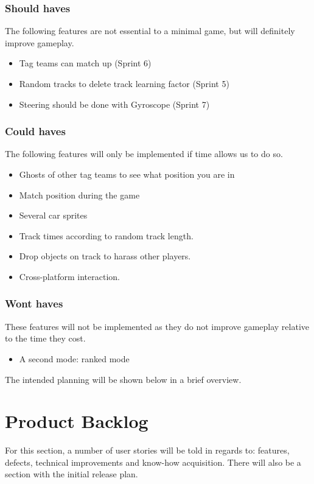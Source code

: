 \documentclass{article}
\begin{document}
\subsubsection{Should haves}
The following features are not essential to a minimal game, but will definitely improve gameplay.
\begin{itemize}
    \item Tag teams can match up (Sprint 6)  
    \item Random tracks to delete track learning factor (Sprint 5)
    \item Steering should be done with \gls{Gyroscope} (Sprint 7)
\end{itemize}
\subsubsection{Could haves}
The following features will only be implemented if time allows us to do so.
\begin{itemize}
    \item \gls{Ghosts} of other tag teams to see what position you are in 
    \item Match position during the game
    \item Several car sprites
    \item Track times according to random track length.
    \item Drop objects on track to harass other players.
    \item Cross-platform interaction.
\end{itemize}
\subsubsection{Wont haves}
These features will not be implemented as they do not improve gameplay relative to the time they cost.
\begin{itemize}
    \item A second mode: ranked mode
\end{itemize}
The intended planning will be shown below in a brief overview.
\section{Product Backlog}
For this section, a number of user stories will be told in regards to: features, defects,  technical improvements and know-how acquisition. There will also be a section with the initial release plan.
\end{document}
